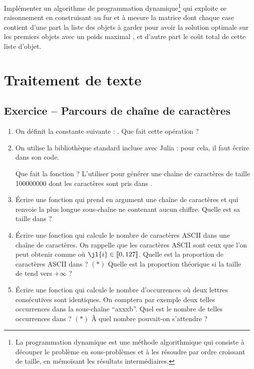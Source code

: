 \documentclass{article}
\newcounter{loop}
\newcounter{numEx}
\newcommand{\exo}[1]{
	\stepcounter{numEx}
	\setcounter{loop}{0}
	\subsection*{Exercice \arabic{numEx} -- #1}
}
\newcommand{\llbra}{\left\llbracket}
\newcommand{\rrbra}{\right\rrbracket}
\renewcommand{\brack}[1]{\ensuremath{\llbra#1\rrbra}}
\begin{document}
{\begin{enumerate}
	Implémenter un algorithme de programmation dynamique\footnote{La programmation dynamique est une méthode algorithmique qui consiste à découper le problème en sous-problèmes et à les résoudre par ordre croissant de taille, en mémoïsant les résultats intermédiaires.} qui exploite ce raisonnement en construisant au fur et à mesure la matrice  dont chaque case  contient d'une part la liste des objets à garder pour avoir la solution optimale sur les  premiers objets avec un poids maximal , et d'autre part le coût total de cette liste d'objet.
\end{enumerate}

\section{Traitement de texte}

\exo{Parcours de chaîne de caractères}

\begin{enumerate}
	\item On définit la constante suivante : . Que fait cette opération ?

	\item On utilise la bibliothèque standard  incluse avec Julia : pour cela, il faut écrire  dans son code.

	Que fait la fonction  ? L'utiliser pour générer une chaîne de caractères  de taille \num{100000000} dont les caractères sont pris dans .

	\item Écrire une fonction qui prend en argument une chaîne de caractères et qui renvoie la plus longue sous-chaîne ne contenant aucun chiffre. Quelle est sa taille dans  ?

	\item Écrire une fonction qui calcule le nombre de caractères ASCII dans une chaîne de caractères. On rappelle que les caractères ASCII sont ceux que l'on peut obtenir comme  où $\jl{i}\in\brack{0, 127}$. Quelle est la proportion de caractères ASCII dans  ? $(*)$ Quelle est la proportion théorique si la taille de  tend vers $+\infty$ ?

	\item Écrire une fonction qui calcule le nombre d'occurrences où deux lettres consécutives sont identiques. On comptera par exemple deux telles occurrences dans la sous-chaîne ``axxxb''. Quel est le nombre de telles occurrences dans  ? $(*)$ À quel nombre pouvait-on s'attendre ?
	

\end{enumerate}}
\end{document}
